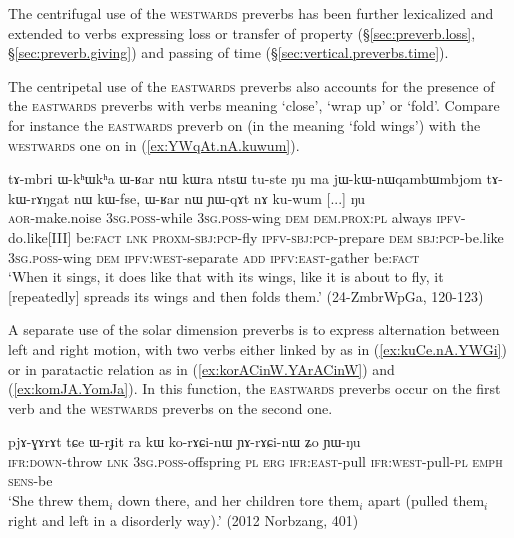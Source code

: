 The centrifugal use of the \textsc{westwards} preverbs has been further lexicalized and extended to verbs expressing loss or transfer of property (§\ref{sec:preverb.loss}, §\ref{sec:preverb.giving}) and passing of time (§\ref{sec:vertical.preverbs.time}).

The centripetal use of the \textsc{eastwards} preverbs also accounts for the presence of the \textsc{eastwards} preverbs with verbs meaning `close', `wrap up' or `fold'. Compare for instance the \textsc{eastwards} preverb on  (in the meaning `fold wings') with the \textsc{westwards} one on  in (\ref{ex:YWqAt.nA.kuwum}).

\begin{exe}
\ex \label{ex:YWqAt.nA.kuwum}
\gll  tɤ-mbri ɯ-kʰɯkʰa ɯ-ʁar nɯ kɯra ntsɯ tu-ste ŋu ma jɯ-kɯ-nɯqambɯmbjom tɤ-kɯ-rɤŋgat nɯ kɯ-fse, ɯ-ʁar nɯ ɲɯ-qɤt nɤ ku-wum [...] ŋu  \\
\textsc{aor}-make.noise \textsc{3sg}.\textsc{poss}-while \textsc{3sg}.\textsc{poss}-wing \textsc{dem} \textsc{dem}.\textsc{prox}:\textsc{pl} always \textsc{ipfv}-do.like[III] be:\textsc{fact} \textsc{lnk} \textsc{proxm}-\textsc{sbj}:\textsc{pcp}-fly \textsc{ipfv}-\textsc{sbj}:\textsc{pcp}-prepare \textsc{dem} \textsc{sbj}:\textsc{pcp}-be.like \textsc{3sg}.\textsc{poss}-wing \textsc{dem} \textsc{ipfv}:\textsc{west}-separate \textsc{add} \textsc{ipfv}:\textsc{east}-gather  {  } be:\textsc{fact} \\
\glt `When it sings, it does like that with its wings, like it is about to fly, it [repeatedly] spreads its wings and then folds them.' (24-ZmbrWpGa, 120-123)
\end{exe}

A separate use of the solar dimension preverbs is to express alternation between left and right motion, with two verbs either linked by  as in (\ref{ex:kuCe.nA.YWGi}) or in paratactic relation as in (\ref{ex:korACinW.YArACinW}) and (\ref{ex:komJA.YomJa}). In this function, the \textsc{eastwards} preverbs occur on the first verb and the \textsc{westwards} preverbs on the second one. 

\begin{exe}
\ex \label{ex:korACinW.YArACinW}
\gll pjɤ-ɣɤrɤt tɕe ɯ-rɟit ra kɯ ko-rɤɕi-nɯ ɲɤ-rɤɕi-nɯ ʑo ɲɯ-ŋu \\
\textsc{ifr}:\textsc{down}-throw \textsc{lnk} \textsc{3sg}.\textsc{poss}-offspring \textsc{pl} \textsc{erg} \textsc{ifr}:\textsc{east}-pull \textsc{ifr}:\textsc{west}-pull-\textsc{pl} \textsc{emph} \textsc{sens}-be \\
\glt `She threw them$_i$ down there, and her children tore them$_i$  apart (pulled them$_i$  right and left in a disorderly way).' (2012 Norbzang, 401)
\end{exe} 

